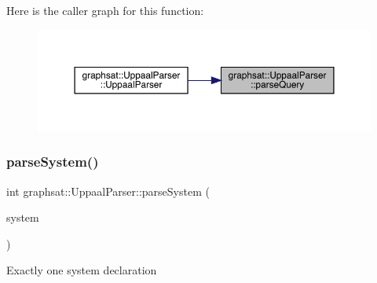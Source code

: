 Here is the caller graph for this function\+:
\nopagebreak
\begin{figure}[H]
\begin{center}
\leavevmode
\includegraphics[width=350pt]{classgraphsat_1_1_uppaal_parser_a100e59360c8910f1dad2f0646255ffcc_icgraph}
\end{center}
\end{figure}
\mbox{\label{classgraphsat_1_1_uppaal_parser_ac9dd720630e0d655635396e651d13465}} 
\subsubsection{\texorpdfstring{parseSystem()}{parseSystem()}}
{\footnotesize\ttfamily int graphsat\+::\+Uppaal\+Parser\+::parse\+System (\begin{DoxyParamCaption}\item[{\mbox{\hyperlink{namespacegraphsat_a94de7ec8ce4b5d6bc48bdc19e58b2d76}{X\+M\+L\+\_\+P}}}]{system }\end{DoxyParamCaption})\hspace{0.3cm}{\ttfamily [private]}}

Exactly one system declaration

